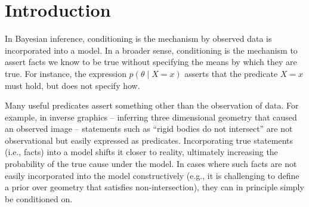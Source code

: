 
\section{Introduction}


In Bayesian inference, conditioning is the mechanism by observed data is incorporated into a model.
In a broader sense, conditioning is the mechanism to assert facts we know to be true without specifying the means by which they are true.
For instance, the expression $p(\theta \mid X = x)$ asserts that the predicate $X = x$ must hold, but does not specify how.

Many useful predicates assert something other than the observation of data.
For example, in inverse graphics \cite{} -- inferring three dimensional geometry that caused an observed image -- statements such as ``rigid bodies do not intersect'' are not observational but easily expressed as predicates.
Incorporating true statements (i.e., facts) into a model shifts it closer to reality, ultimately increasing the probability of the true cause under the model.
In cases where such facts are not easily incorporated into the model constructively (e.g., it is challenging to define a prior over geometry that satisfies non-intersection), they can in principle simply be conditioned on.


